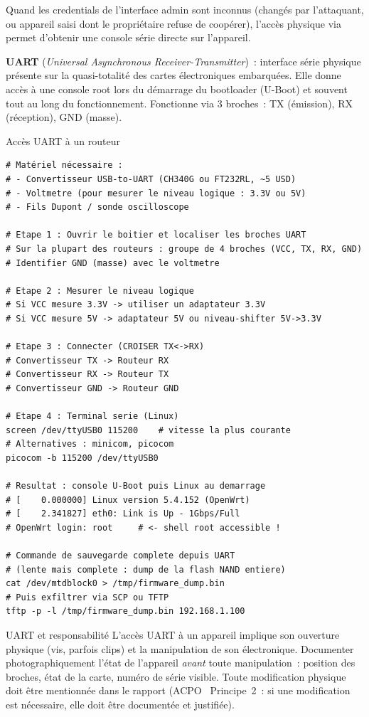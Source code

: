 Quand les credentials de l'interface admin sont inconnus (changés par
l'attaquant, ou appareil saisi dont le propriétaire refuse de coopérer),
l'accès physique via  permet d'obtenir une
console série directe sur l'appareil.

\begin{boxdef}
\textbf{UART} (\textit{Universal Asynchronous Receiver-Transmitter})~:
interface série physique présente sur la quasi-totalité des cartes
électroniques embarquées. Elle donne accès à une console root lors
du démarrage du bootloader (U-Boot) et souvent tout au long du
fonctionnement. Fonctionne via 3 broches~: TX (émission), RX
(réception), GND (masse).
\end{boxdef}

\begin{boxoutils}{Accès UART à un routeur}
\begin{lstlisting}[language=bash_forensique]
# Matériel nécessaire :
# - Convertisseur USB-to-UART (CH340G ou FT232RL, ~5 USD)
# - Voltmetre (pour mesurer le niveau logique : 3.3V ou 5V)
# - Fils Dupont / sonde oscilloscope

# Etape 1 : Ouvrir le boitier et localiser les broches UART
# Sur la plupart des routeurs : groupe de 4 broches (VCC, TX, RX, GND)
# Identifier GND (masse) avec le voltmetre

# Etape 2 : Mesurer le niveau logique
# Si VCC mesure 3.3V -> utiliser un adaptateur 3.3V
# Si VCC mesure 5V -> adaptateur 5V ou niveau-shifter 5V->3.3V

# Etape 3 : Connecter (CROISER TX<->RX)
# Convertisseur TX -> Routeur RX
# Convertisseur RX -> Routeur TX
# Convertisseur GND -> Routeur GND

# Etape 4 : Terminal serie (Linux)
screen /dev/ttyUSB0 115200    # vitesse la plus courante
# Alternatives : minicom, picocom
picocom -b 115200 /dev/ttyUSB0

# Resultat : console U-Boot puis Linux au demarrage
# [    0.000000] Linux version 5.4.152 (OpenWrt)
# [    2.341827] eth0: Link is Up - 1Gbps/Full
# OpenWrt login: root     # <- shell root accessible !

# Commande de sauvegarde complete depuis UART
# (lente mais complete : dump de la flash NAND entiere)
cat /dev/mtdblock0 > /tmp/firmware_dump.bin
# Puis exfiltrer via SCP ou TFTP
tftp -p -l /tmp/firmware_dump.bin 192.168.1.100
\end{lstlisting}
\end{boxoutils}

\begin{boiteRemarque}{UART et responsabilité}
L'accès UART à un appareil implique son ouverture physique (vis, parfois
clips) et la manipulation de son électronique. Documenter photographiquement
l'état de l'appareil \emph{avant} toute manipulation~: position des
broches, état de la carte, numéro de série visible. Toute modification
physique doit être mentionnée dans le rapport (ACPO~\cite{acpo2012} Principe~2~: si une
modification est nécessaire, elle doit être documentée et justifiée).
\end{boiteRemarque}

